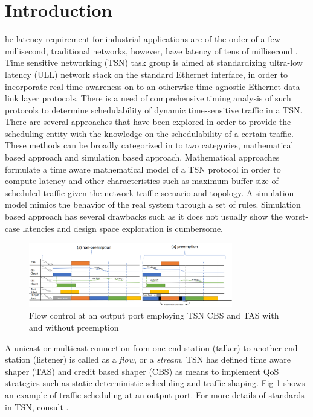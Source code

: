 \documentclass[journal,12pt,twocolumn]{IEEEtran}
\begin{document}
\section{Introduction}
% 
% 
% 
% 
he latency requirement for industrial applications are of the order of a few millisecond, traditional networks, however, have latency of tens of millisecond \cite{LATENCY}.  Time sensitive networking (TSN) task group \cite{TSN} is aimed at standardizing ultra-low latency (ULL) network stack on the standard Ethernet interface, in order to incorporate real-time awareness on to an otherwise time agnostic Ethernet data link layer protocols. There is a need of comprehensive timing analysis of such protocols to determine schedulability of dynamic time-sensitive traffic in a TSN.  There are several approaches that have been explored in order to provide the scheduling entity with the knowledge on the schedulability of a certain traffic. These methods can be broadly categorized in to two categories, mathematical based approach and simulation based approach. Mathematical approaches formulate a time aware mathematical model of a TSN protocol in order to compute latency and other characteristics such as maximum buffer size of scheduled traffic given the network traffic scenario and topology. A simulation model mimics the behavior of the real system through a set of rules. Simulation based approach has several drawbacks such as it does not usually show the worst-case latencies and design space exploration is cumbersome. 

\begin{figure}
\centering
\includegraphics[width=3.5in]{TSNFlowControl}
\caption{Flow control at an output port employing TSN CBS and TAS with and without preemption}
\label{TSN_FlowControl}
\end{figure}
A unicast or multicast connection from one end station (talker) to another end station (listener) is called as a \emph {flow}, or a \emph {stream}. TSN has defined time aware shaper (TAS) \cite{IEEE802.1Qbv} and credit based shaper (CBS) \cite{IEEE802.1Qav} as means to implement QoS strategies such as static deterministic scheduling and traffic shaping. Fig \ref{TSN_FlowControl} shows an example of traffic scheduling at an output port. For more details of standards in TSN, consult \cite{ULL}.
\end{document}
